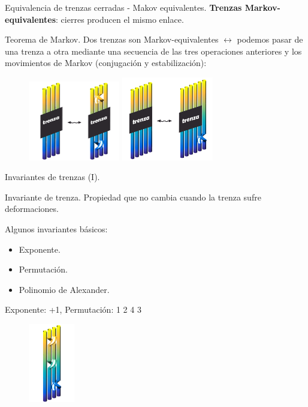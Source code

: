 \documentclass{beamer}
\begin{document}
\begin{frame}{Equivalencia de trenzas cerradas - Makov equivalentes.}
    \textbf{Trenzas Markov-equivalentes}: cierres producen el mismo enlace. \\
	
	\begin{alertblock}{Teorema de Markov.}
		Dos trenzas son Markov-equivalentes $ \leftrightarrow $ podemos pasar de una trenza a otra mediante una secuencia de las tres operaciones anteriores y los movimientos de Markov (conjugación y estabilización):
	\end{alertblock}
	\begin{figure}[h!]
		\includegraphics[width=4cm]{imagenes/M4.png}
		\includegraphics[width=4cm]{imagenes/M5.png}
	\end{figure}
\end{frame}

\begin{frame}{Invariantes de trenzas (I).}
	\begin{block}{Invariante de trenza.}
		Propiedad que no cambia cuando la trenza sufre deformaciones.
	\end{block}
		Algunos invariantes básicos:
		\begin{itemize}
			\item Exponente.
			\item Permutación. 
			\item Polinomio de Alexander. 
		\end{itemize}
		\pause
		\begin{exampleblock}{Exponente: +1, Permutación: 1 2 4 3}
			\begin{figure}[h!]
				\includegraphics[width=2cm]{imagenes/7c1.png}
			\end{figure}
		\end{exampleblock}
\end{frame}
\end{document}
